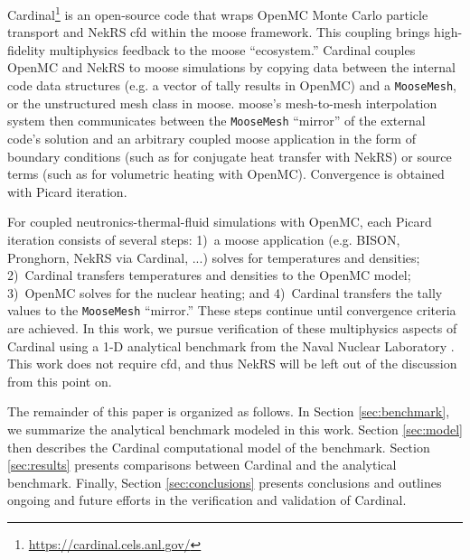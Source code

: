 \documentclass[letterpaper]{mc2023}
\begin{document}
Cardinal\footnote{\url{https://cardinal.cels.anl.gov/}} is an open-source code \cite{novak2022-cardinal,cardinal-website}
that wraps OpenMC \cite{openmc} Monte Carlo particle transport and NekRS \cite{nekrs} \gls{cfd} within the \gls{moose}
\cite{lindsay2022moose} framework. This coupling brings high-fidelity multiphysics feedback to the \gls{moose} ``ecosystem.''
Cardinal couples OpenMC and NekRS to \gls{moose} simulations by copying data between the internal code data structures
(e.g. a vector of tally results in OpenMC) and a \texttt{MooseMesh}, or the unstructured mesh class in \gls{moose}. \gls{moose}'s
mesh-to-mesh interpolation system then communicates between the \texttt{MooseMesh} ``mirror'' of the external code's solution
and an arbitrary coupled \gls{moose} application in the form of boundary conditions (such as for conjugate heat transfer with
NekRS) or source terms (such as for volumetric heating with OpenMC). Convergence is obtained with Picard iteration.

For coupled neutronics-thermal-fluid simulations with OpenMC, each Picard iteration consists of several steps: 1)~a \gls{moose}
application (e.g. BISON, Pronghorn, NekRS via Cardinal, ...) solves for temperatures and densities; 2)~Cardinal transfers
temperatures and densities to the OpenMC model; 3)~OpenMC solves for the nuclear heating; and 4)~Cardinal transfers the tally
values to the \texttt{MooseMesh} ``mirror.'' These steps continue until convergence criteria are achieved. In this work, we
pursue verification of these multiphysics aspects of Cardinal using a 1-D analytical benchmark from the Naval Nuclear
Laboratory \cite{analytical-benchmark}.  This work does not require \gls{cfd}, and thus NekRS will be left out of the
discussion from this point on.

The remainder of this paper is organized as follows. In Section \ref{sec:benchmark}, we summarize the analytical benchmark
modeled in this work. Section \ref{sec:model} then describes the Cardinal computational model of the benchmark. Section
\ref{sec:results} presents comparisons between Cardinal and the analytical benchmark. Finally, Section \ref{sec:conclusions}
presents conclusions and outlines ongoing and future efforts in the verification and validation of Cardinal.
\end{document}
